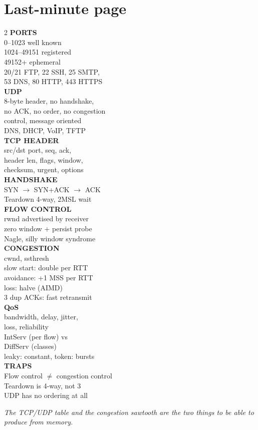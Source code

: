 \documentclass[11pt,a4paper]{article}
\begin{document}
\section{Last-minute page}

\begin{multicols}{2}
\textbf{PORTS}\\
0--1023 well known\\
1024--49151 registered\\
49152+ ephemeral\\
20/21 FTP, 22 SSH, 25 SMTP,\\
53 DNS, 80 HTTP, 443 HTTPS\\[5pt]
\textbf{UDP}\\
8-byte header, no handshake,\\
no ACK, no order, no congestion\\
control, message oriented\\
DNS, DHCP, VoIP, TFTP\\[5pt]
\textbf{TCP HEADER}\\
src/dst port, seq, ack,\\
header len, flags, window,\\
checksum, urgent, options\\[5pt]
\textbf{HANDSHAKE}\\
SYN $\to$ SYN+ACK $\to$ ACK\\
Teardown 4-way, 2MSL wait\\[5pt]
\textbf{FLOW CONTROL}\\
rwnd advertised by receiver\\
zero window + persist probe\\
Nagle, silly window syndrome\\[5pt]
\textbf{CONGESTION}\\
cwnd, ssthresh\\
slow start: double per RTT\\
avoidance: +1 MSS per RTT\\
loss: halve (AIMD)\\
3 dup ACKs: fast retransmit\\[5pt]
\textbf{QoS}\\
bandwidth, delay, jitter,\\
loss, reliability\\
IntServ (per flow) vs\\
DiffServ (classes)\\
leaky: constant, token: bursts\\[5pt]
\textbf{TRAPS}\\
Flow control $\neq$ congestion control\\
Teardown is 4-way, not 3\\
UDP has no ordering at all
\end{multicols}

\vfill
\begin{center}\textit{The TCP/UDP table and the congestion sawtooth are the two things to be able to produce from memory.}\end{center}
\end{document}
